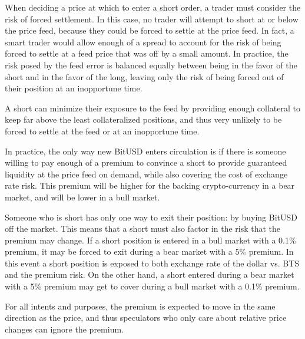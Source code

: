 When deciding a price at which to enter a short order, a trader must consider
the risk of forced settlement. In this case, no trader will attempt to short at
or below the price feed, because they could be forced to settle at the price
feed. In fact, a smart trader would allow enough of a spread to account for the
risk of being forced to settle at a feed price that was off by a small amount.
In practice, the risk posed by the feed error is balanced equally between being
in the favor of the short and in the favor of the long, leaving only the risk
of being forced out of their position at an inopportune time.

A short can minimize their exposure to the feed by providing enough collateral
to keep far above the least collateralized positions, and thus very unlikely to
be forced to settle at the feed or at an inopportune time.

In practice, the only way new BitUSD enters circulation is if there is someone
willing to pay enough of a premium to convince a short to provide guaranteed
liquidity at the price feed on demand, while also covering the cost of exchange
rate risk. This premium will be higher for the backing crypto-currency in a bear
market, and will be lower in a bull market.

Someone who is short has only one way to exit their position: by buying BitUSD
off the market. This means that a short must also factor in the risk that the
premium may change. If a short position is entered in a bull market with a 0.1\%
premium, it may be forced to exit during a bear market with a 5\% premium. In
this event a short position is exposed to both exchange rate of the dollar vs.
BTS and the premium risk. On the other hand, a short entered during a bear
market with a 5\% premium may get to cover during a bull market with a 0.1\%
premium.

For all intents and purposes, the premium is expected to move in the same
direction as the price, and thus speculators who only care about relative price
changes can ignore the premium.
